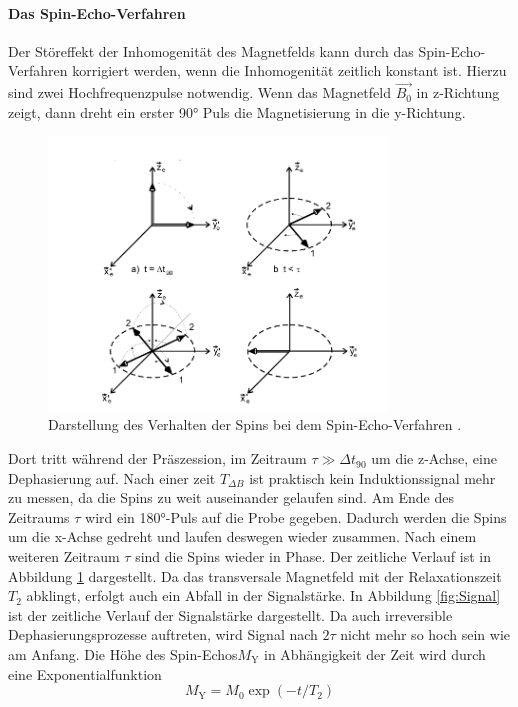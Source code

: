 \paragraph{Das Spin-Echo-Verfahren}
Der Störeffekt der Inhomogenität des Magnetfelds kann durch das Spin-Echo-Verfahren
korrigiert werden, wenn die Inhomogenität zeitlich konstant ist. Hierzu sind zwei Hochfrequenzpulse
notwendig. Wenn das Magnetfeld $\vec{B_0}$ in z-Richtung zeigt, dann dreht ein
erster 90° Puls die Magnetisierung in die y-Richtung.
\begin{figure}[H]
  \centering
  \includegraphics[width=0.8\textwidth]{pics/SEM.png}
  \caption{Darstellung des Verhalten der Spins bei dem Spin-Echo-Verfahren \cite{Anleitung}.}
  \label{fig:SEM}
\end{figure}
Dort tritt während der
Präszession, im Zeitraum $ \tau \gg \Delta t_{90}$ um die z-Achse, eine Dephasierung auf.
Nach einer zeit $T_{\Delta B}$ ist praktisch kein Induktionssignal mehr zu messen, da
die Spins zu weit auseinander gelaufen sind. Am Ende des Zeitraums $\tau$ wird
ein 180°-Puls auf die Probe gegeben. Dadurch werden die Spins um die x-Achse gedreht und
laufen deswegen wieder zusammen. Nach einem weiteren Zeitraum $\tau$ sind die
Spins wieder in Phase. Der zeitliche Verlauf ist in Abbildung \ref{fig:SEM} dargestellt.
Da das transversale Magnetfeld mit der Relaxationszeit $T_2$ abklingt, erfolgt auch ein
Abfall in der Signalstärke. In Abbildung \ref{fig:Signal} ist der zeitliche Verlauf der
Signalstärke dargestellt. Da auch irreversible Dephasierungsprozesse auftreten, wird
Signal nach $2\tau$ nicht mehr so hoch sein wie am Anfang. Die
Höhe des Spin-Echos$M_{\text{Y}}$ in Abhängigkeit der Zeit wird durch eine
Exponentialfunktion
\begin{equation}
  M_{\text{Y}}=M_0 \exp{(-t/T_2)}
\label{eq:MYT2}
\end{equation}
